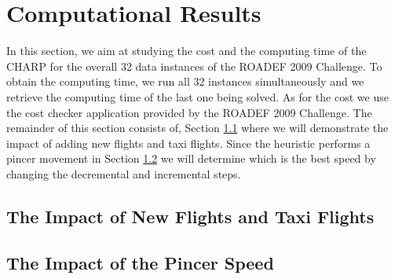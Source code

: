 \section{Computational Results}\label{sec:compResults}

In this section, we aim at studying the cost and the computing time of the CHARP for the overall 32 data instances of the ROADEF 2009 Challenge.  To obtain the computing time, we run all 32 instances simultaneously and we retrieve the computing time of the last one being solved. As for the cost we use the cost checker application provided by the ROADEF 2009 Challenge. The remainder of this section consists of, Section \ref{sec:impact} where we will demonstrate the impact of adding new flights and taxi flights. Since the heuristic performs a pincer movement in Section \ref{sec:pincerSpeed} we will determine which is the best speed by changing the decremental and incremental steps.\\
 


\subsection{The Impact of New Flights and Taxi Flights}\label{sec:impact}

  
\subsection{The Impact of the Pincer Speed}\label{sec:pincerSpeed}

 




